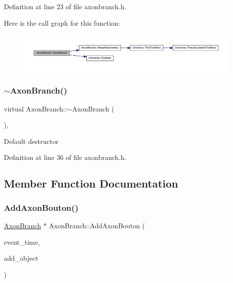 Definition at line 23 of file axonbranch.\+h.

Here is the call graph for this function\+:\nopagebreak
\begin{figure}[H]
\begin{center}
\leavevmode
\includegraphics[width=350pt]{class_axon_branch_a98f33462edf82dacab750d1140172912_cgraph}
\end{center}
\end{figure}
\mbox{\label{class_axon_branch_ae4ef4c954b43d084cafb30cf900a1728}} 
\subsubsection{\texorpdfstring{$\sim$\+Axon\+Branch()}{~AxonBranch()}}
{\footnotesize\ttfamily virtual Axon\+Branch\+::$\sim$\+Axon\+Branch (\begin{DoxyParamCaption}{ }\end{DoxyParamCaption})\hspace{0.3cm}{\ttfamily [inline]}, {\ttfamily [virtual]}}

Default destructor 

Definition at line 36 of file axonbranch.\+h.



\subsection{Member Function Documentation}
\mbox{\label{class_axon_branch_a88e6af84b45bb6f6f8900a6d4aec446c}} 
\subsubsection{\texorpdfstring{Add\+Axon\+Bouton()}{AddAxonBouton()}}
{\footnotesize\ttfamily \mbox{\hyperlink{class_axon_branch}{Axon\+Branch}} $\ast$ Axon\+Branch\+::\+Add\+Axon\+Bouton (\begin{DoxyParamCaption}\item[{std\+::chrono\+::time\+\_\+point$<$ \mbox{\hyperlink{universe_8h_a0ef8d951d1ca5ab3cfaf7ab4c7a6fd80}{Clock}} $>$}]{event\+\_\+time,  }\item[{\mbox{\hyperlink{class_axon_branch}{Axon\+Branch}} $\ast$}]{add\+\_\+object }\end{DoxyParamCaption})}



